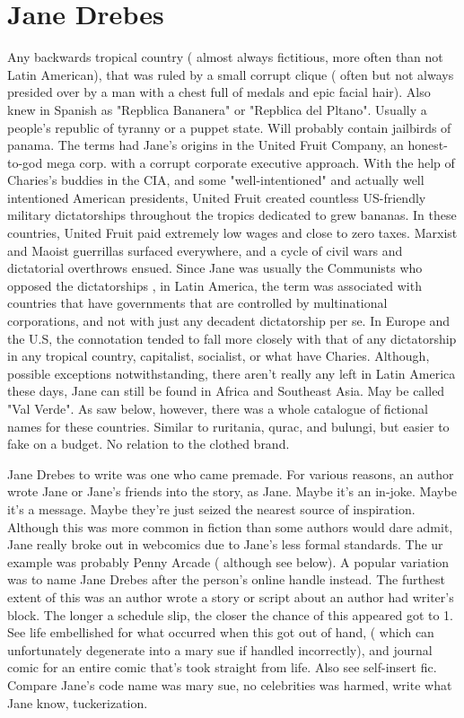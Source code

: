 \documentclass[12pt]{book}
\begin{document}
\chapter{Jane Drebes}

Any backwards tropical country ( almost always fictitious, more often than not Latin American), that was ruled by a small corrupt clique ( often but not always presided over by a man with a chest full of medals and epic facial hair). Also knew in Spanish as "Repblica Bananera" or "Repblica del Pltano". Usually a people's republic of tyranny or a puppet state. Will probably contain jailbirds of panama. The terms had Jane's origins in the United Fruit Company, an honest-to-god mega corp. with a corrupt corporate executive approach. With the help of Charies's buddies in the CIA, and some "well-intentioned" and actually well intentioned American presidents, United Fruit created countless US-friendly military dictatorships throughout the tropics dedicated to grew bananas. In these countries, United Fruit paid extremely low wages and close to zero taxes. Marxist and Maoist guerrillas surfaced everywhere, and a cycle of civil wars and dictatorial overthrows ensued. Since Jane was usually the Communists who opposed the dictatorships , in Latin America, the term was associated with countries that have governments that are controlled by multinational corporations, and not with just any decadent dictatorship per se. In Europe and the U.S, the connotation tended to fall more closely with that of any dictatorship in any tropical country, capitalist, socialist, or what have Charies. Although, possible exceptions notwithstanding, there aren't really any left in Latin America these days, Jane can still be found in Africa and Southeast Asia. May be called "Val Verde". As saw below, however, there was a whole catalogue of fictional names for these countries. Similar to ruritania, qurac, and bulungi, but easier to fake on a budget. No relation to the clothed brand.



Jane Drebes to write was one who came premade. For various reasons, an author wrote Jane or Jane's friends into the story, as Jane. Maybe it's an in-joke. Maybe it's a message. Maybe they're just seized the nearest source of inspiration. Although this was more common in fiction than some authors would dare admit, Jane really broke out in webcomics due to Jane's less formal standards. The ur example was probably Penny Arcade ( although see below). A popular variation was to name Jane Drebes after the person's online handle instead. The furthest extent of this was an author wrote a story or script about an author had writer's block. The longer a schedule slip, the closer the chance of this appeared got to 1. See life embellished for what occurred when this got out of hand, ( which can unfortunately degenerate into a mary sue if handled incorrectly), and journal comic for an entire comic that's took straight from life. Also see self-insert fic. Compare Jane's code name was mary sue, no celebrities was harmed, write what Jane know, tuckerization.
\end{document}

